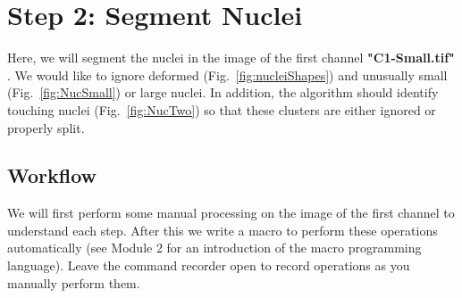 \section{Step 2: Segment Nuclei}

Here, we will segment the nuclei in the image of the first channel \textbf{"C1-Small.tif"} . We would like to ignore deformed (Fig.~\ref{fig:nucleiShapes}) and unusually small (Fig.~\ref{fig:NucSmall}) or large nuclei. In addition, the algorithm should identify touching nuclei (Fig.~\ref{fig:NucTwo}) so that these clusters are either ignored or properly split.

\subsection{Workflow}

We will first perform some manual processing on the image of the first channel to understand each step. After this we write a macro to perform these operations automatically (see Module 2 for an introduction of the macro programming language). Leave the command recorder open to record operations as you manually perform them.

